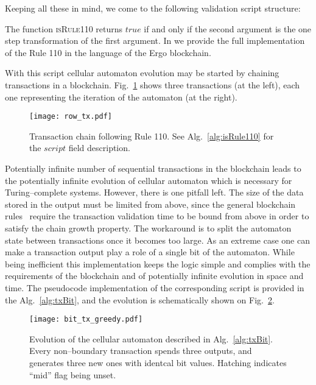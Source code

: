 \documentclass[runningheads]{llncs}
\begin{document}
    Keeping all these in mind, we come to the following validation
    script structure:
    
    The function \textsc{isRule110} returns $true$ if and only if the second
    argument is the one step transformation of the first argument.  In
     we provide the full implementation of the Rule
    110 in the language of the Ergo blockchain.  

    With this script cellular automaton evolution may be started by
    chaining transactions in a blockchain. Fig.~\ref{fig:txs} shows three
    transactions (at the left), each one representing the iteration of the 
    automaton (at the right).

    \begin{figure}[h]
        \centering
        \texttt{[image: row\_tx.pdf]}
        \caption{Transaction chain following Rule 110. See
            Alg.~\ref{alg:isRule110} for the
            $script$ field description.
        \label{fig:txs} }
    \end{figure}
    Potentially infinite number of sequential transactions in the blockchain
    leads to the potentially infinite evolution of cellular automaton which is
    necessary for Turing--complete systems.  However, there is one pitfall left.
    The size of the data stored in the output must be limited from above, since
    the general blockchain rules~\cite{garay2015bitcoin} require the transaction
    validation time to be bound from above in order to satisfy the chain growth
    property. The workaround is to split the automaton state between
    transactions once it becomes too large. As an extreme case one can make a
    transaction output play a role of a single bit of the automaton. While being
    inefficient this implementation keeps the logic simple and complies with the
    requirements of the blockchain and of potentially infinite evolution in
    space and time. The pseudocode implementation of the corresponding script is
    provided in the Alg.~\ref{alg:txBit}, and the evolution is schematically shown
    on Fig.~\ref{fig:bit_txs}.
    \begin{figure}[h]
        \centering
        \texttt{[image: bit\_tx\_greedy.pdf]}
        \caption{Evolution of the cellular automaton described in
            Alg.~\ref{alg:txBit}. Every non--boundary transaction spends three
            outputs, and generates three new ones with identcal bit values.
            Hatching indicates ``mid'' flag being unset.
        \label{fig:bit_txs} }
    \end{figure}
    
\end{document}
